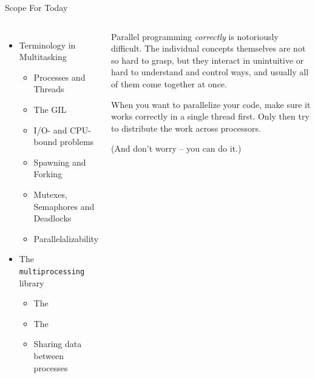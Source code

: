 \begin{frame}{Scope For Today}
%
\begin{columns}[T]
\begin{itemize}
\item Terminology in Multitasking
	\begin{itemize}
	\item Processes and Threads
	\item The GIL
	\item I/O- and CPU-bound problems
	\item Spawning and Forking
	\item Mutexes, Semaphores and Deadlocks
	\item Parallelalizability
	\end{itemize}
\item The \texttt{multiprocessing} library
	\begin{itemize}
	\item The 
	\item The 
	\item Sharing data between processes
	\end{itemize}
\end{itemize}
%
\begin{warnbox}
\small
Parallel programming \emph{correctly} is notoriously difficult. The individual concepts themselves are not so hard to grasp, but they interact in unintuitive or hard to understand and control ways, and usually all of them come together at once.

\vspace{6pt}
When you want to parallelize your code, make sure it works correctly in a single thread first. Only then try to distribute the work across processors.

\vspace{6pt}
(And don't worry -- you can do it.)
\end{warnbox}
\end{columns}
%
\end{frame}


